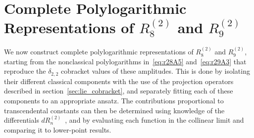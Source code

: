 \documentclass[11pt]{article}
\def\pdfeq#1{\texorpdfstring{$#1$}{a}}
\begin{document}

\section{Complete Polylogarithmic Representations of \pdfeq{R_8^{(2)}} and \pdfeq{R_9^{(2)}}}
\label{sec:r28_and_r29}

We now construct complete polylogarithmic representations of $R_8^{(2)}$\! and $R_9^{(2)}$\!, starting from the nonclassical polylogarithms in~\eqref{eq:r28A5} and~\eqref{eq:r29A3} that reproduce the $\delta_{2,2}$ cobracket values of these amplitudes. This is done by isolating their different classical components with the use of the projection operators described in section~\ref{sec:lie_cobracket}, and separately fitting each of these components to an appropriate ansatz.
The contributions proportional to transcendental constants can then be determined using knowledge of the differentials $dR_n^{(2)}$\!~\cite{CaronHuot:2011ky,Golden:2013lha}, and by evaluating each function in the collinear limit and comparing it to lower-point results.


\end{document}
